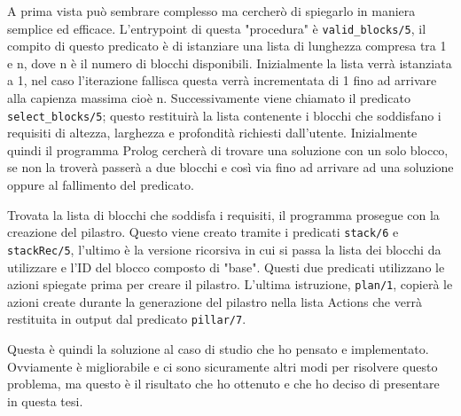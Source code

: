 A prima vista può sembrare complesso ma cercherò di spiegarlo in maniera semplice ed efficace. L'entrypoint di questa "procedura" è \verb+valid_blocks/5+, il compito di questo predicato è di istanziare una lista di lunghezza compresa tra 1 e n, dove n è il numero di blocchi disponibili. Inizialmente la lista verrà istanziata a 1, nel caso l'iterazione fallisca questa verrà incrementata di 1 fino ad arrivare alla capienza massima cioè n.
Successivamente viene chiamato il predicato \verb+select_blocks/5+; questo restituirà la lista contenente i blocchi che soddisfano i requisiti di altezza, larghezza e profondità richiesti dall'utente. Inizialmente quindi il programma Prolog cercherà di trovare una soluzione con un solo blocco, se non la troverà passerà a due blocchi e così via fino ad arrivare ad una soluzione oppure al fallimento del predicato.

Trovata la lista di blocchi che soddisfa i requisiti, il programma prosegue con la creazione del pilastro. Questo viene creato tramite i predicati \verb+stack/6+ e \verb+stackRec/5+, l'ultimo è la versione ricorsiva in cui si passa la lista dei blocchi da utilizzare e l'ID del blocco composto di "base". Questi due predicati utilizzano le azioni spiegate prima per creare il pilastro. L'ultima istruzione, \verb+plan/1+, copierà le azioni create durante la generazione del pilastro nella lista Actions che verrà restituita in output dal predicato \verb+pillar/7+.

Questa è quindi la soluzione al caso di studio che ho pensato e implementato. Ovviamente è migliorabile e ci sono sicuramente altri modi per risolvere questo problema, ma questo è il risultato che ho ottenuto e che ho deciso di presentare in questa tesi.

